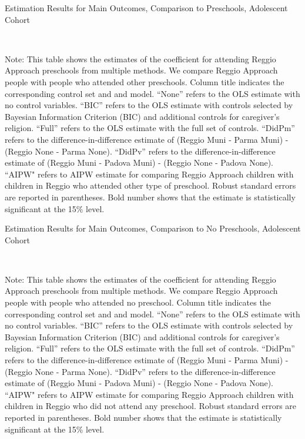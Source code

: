 \begin{landscape}
\begin{table}[H]
\end{table}


\begin{table}[H] \caption{Estimation Results for Main Outcomes, Comparison to Preschools, Adolescent Cohort} \label{ols-M-adol-reg-pres}
\scalebox{0.9}{}
\vspace{1ex} \\
\footnotesize\raggedright{Note: This table shows the estimates of the coefficient for attending Reggio Approach preschools from multiple methods. We compare Reggio Approach people with people who attended other preschools. Column title indicates the corresponding control set and and model. ``None'' refers to the OLS estimate with no control variables. ``BIC'' refers to the OLS estimate with controls selected by Bayesian Information Criterion (BIC) and additional controls for caregiver's religion. ``Full'' refers to the OLS estimate with the full set of controls. ``DidPm'' refers to the difference-in-difference estimate of (Reggio Muni - Parma Muni) - (Reggio None - Parma None). ``DidPv'' refers to the difference-in-difference estimate of (Reggio Muni - Padova Muni) - (Reggio None - Padova None). ``AIPW" refers to AIPW estimate for comparing Reggio Approach children with children in Reggio who attended other type of preschool. Robust standard errors are reported in parentheses. Bold number shows that the estimate is statistically significant at the 15\% level.}
\end{table}

\begin{table}[H] \caption{Estimation Results for Main Outcomes, Comparison to No Preschools, Adolescent Cohort} \label{ols-M-adol-reg-nopres}
\scalebox{0.9}{}
\vspace{1ex} \\
\footnotesize\raggedright{Note: This table shows the estimates of the coefficient for attending Reggio Approach preschools from multiple methods. We compare Reggio Approach people with people who attended no preschool. Column title indicates the corresponding control set and and model. ``None'' refers to the OLS estimate with no control variables. ``BIC'' refers to the OLS estimate with controls selected by Bayesian Information Criterion (BIC) and additional controls for caregiver's religion. ``Full'' refers to the OLS estimate with the full set of controls. ``DidPm'' refers to the difference-in-difference estimate of (Reggio Muni - Parma Muni) - (Reggio None - Parma None). ``DidPv'' refers to the difference-in-difference estimate of (Reggio Muni - Padova Muni) - (Reggio None - Padova None).  ``AIPW" refers to AIPW estimate for comparing Reggio Approach children with children in Reggio who did not attend any preschool. Robust standard errors are reported in parentheses. Bold number shows that the estimate is statistically significant at the 15\% level.}
\end{table}





\end{landscape}
